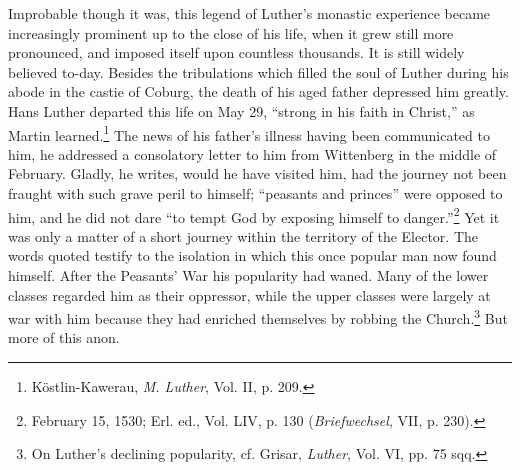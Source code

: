 Improbable though it was, this legend of Luther’s monastic experience
became increasingly prominent up to the close of his life,
when it grew still more pronounced, and imposed itself upon countless
thousands. It is still widely believed to-day.
Besides the tribulations which filled the soul of Luther during his
abode in the castie of Coburg, the death of his aged father depressed
him greatly. Hans Luther departed this life on May 29, “strong in
his faith in Christ,” as Martin learned.\footnote{Köstlin-Kawerau, \textit{M. Luther}, Vol. II, p. 209.}
 The news of his father’s
illness having been communicated to him, he addressed a consolatory
letter to him from Wittenberg in the middle of February. Gladly, he
writes, would he have visited him, had the journey not been fraught
with such grave peril to himself; “peasants and princes” were opposed
to him, and he did not dare “to tempt God by exposing himself to
danger.”\footnote{February 15, 1530; Erl. ed., Vol. LIV, p. 130 (\textit{Briefwechsel}, VII, p. 230).}
 Yet it was only a matter of a short journey within the
territory of the Elector. The words quoted testify to the isolation in
which this once popular man now found himself. After the Peasants’
War his popularity had waned. Many of the lower classes regarded
him as their oppressor, while the upper classes were largely at war
with him because they had enriched themselves by robbing the
Church.\footnote{On Luther’s declining popularity, cf. Grisar, \textit{Luther}, Vol. VI, pp. 75 sqq.}
But more of this anon.
